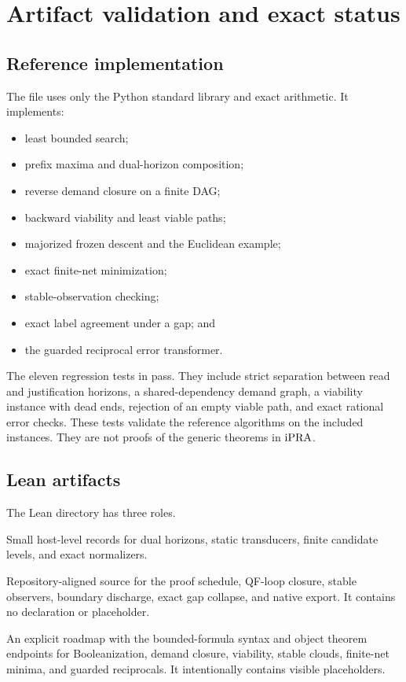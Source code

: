 \section{Artifact validation and exact status}
\label{sec:validation}

\subsection{Reference implementation}

The file  uses only the Python standard library and exact
 arithmetic.  It implements:

\begin{itemize}
\item least bounded search;
\item prefix maxima and dual-horizon composition;
\item reverse demand closure on a finite DAG;
\item backward viability and least viable paths;
\item majorized frozen descent and the Euclidean example;
\item exact finite-net minimization;
\item stable-observation checking;
\item exact label agreement under a gap; and
\item the guarded reciprocal error transformer.
\end{itemize}

The eleven regression tests in  pass.  They include strict
separation between read and justification horizons, a shared-dependency demand graph,
a viability instance with dead ends, rejection of an empty viable path, and exact
rational error checks.  These tests validate the reference algorithms on the included
instances.  They are not proofs of the generic theorems in \(\mathrm{iPRA}\).

\subsection{Lean artifacts}

The Lean directory has three roles.

\begin{description}[style=nextline,leftmargin=2em]
\item[\code{FRNF/Semantic.lean}]
Small host-level records for dual horizons, static transducers, finite candidate
levels, and exact normalizers.
\item[\code{FRNF/Kernel.lean}]
Repository-aligned source for the proof schedule, QF-loop closure, stable observers,
boundary discharge, exact gap collapse, and native export.  It contains no
 declaration or  placeholder.
\item[\code{FRNF/ObjectTargets.lean}]
An explicit roadmap with the bounded-formula syntax and object theorem endpoints for
Booleanization, demand closure, viability, stable clouds, finite-net minima, and
guarded reciprocals.  It intentionally contains visible  placeholders.
\end{description}

